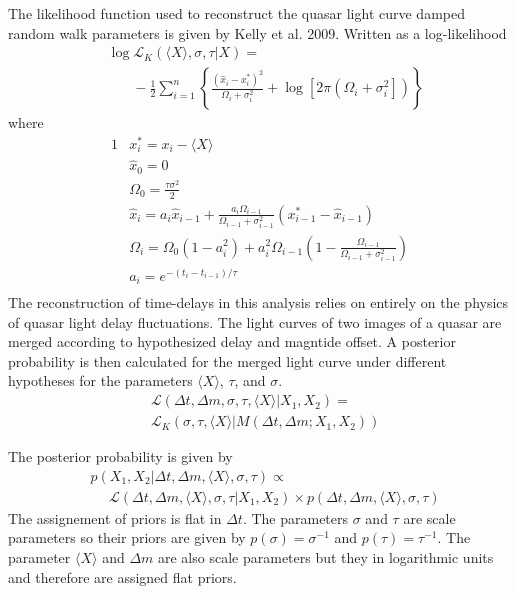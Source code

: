\documentclass{emulateapj}
\begin{document}
The likelihood function used to reconstruct the quasar light curve damped random walk parameters is given by Kelly et al. 2009. Written as a log-likelihood
\begin{align} 
& \log\mathcal{L}_{K}(\langle X\rangle, \sigma,\tau | X) = \nonumber \\
& \ \ \ \ \ \ \ \ -\frac{1}{2}\sum_{i=1}^{n}\left\{
\frac{\left(\hat{x}_i-x^{*}_i\right)^2}{\Omega_i+\sigma_i^2} 
+ 
\log\left[2\pi\left(\Omega_i+\sigma_i^2\right]\right)
\right\}
\end{align}
where 
\begin{alignat}{1}
& x_{i}^{*} = x_i-\langle X \rangle \\
& \hat{x}_0 = 0   \\
& \Omega_{0}=\frac{\tau\sigma^2}{2} \\
& \hat{x}_i = a_i\hat{x}_{i-1} + \frac{a_i\Omega_{i-1}}{\Omega_{i-1}+\sigma^2_{i-1}} \left(x^{*}_{i-1}-\hat{x}_{i-1}\right) \\
& \Omega_{i}=\Omega_{0}\left(1-a_{i}^2\right) + a_{i}^2\Omega_{i-1}\left(1-\frac{\Omega_{i-1}}{\Omega_{i-1}+\sigma_{i-1}^2}\right) \\
& a_i = e^{-\left(t_i-t_{i-1}\right)/\tau} \\
\end{alignat}
The reconstruction of time-delays in this analysis relies on entirely on the physics of quasar light delay fluctuations. The light curves of two images of a quasar are merged according to hypothesized delay and magntide offset. A posterior probability is then calculated for the merged light curve under different hypotheses for the parameters $\langle X\rangle$, $\tau$, and $\sigma$.
\begin{align}
& \mathcal L (\Delta t, \Delta m, \sigma, \tau, \langle X \rangle | X_1, X_2)  = \nonumber \\
& \mathcal{L}_{K} \left( \sigma, \tau, \langle X \rangle  | M(\Delta t,\Delta m ; X_1, X_2) \right)
\end{align}

The posterior probability is given by
\begin{align}
& p(X_1, X_2 | \Delta t, \Delta m, \langle X \rangle, \sigma,\tau) \propto \nonumber \\
&  \ \ \ \ \ \ \mathcal{L}(\Delta t, \Delta m, \langle X \rangle, \sigma,\tau | X_1, X_2)\times p(\Delta t, \Delta m, \langle X \rangle, \sigma,\tau)
\end{align}
The assignement of priors is flat in $\Delta t$. The parameters $\sigma$ and $\tau$ are scale parameters so their priors are given by $p(\sigma)=\sigma^{-1}$ and $p(\tau)=\tau^{-1}$. The parameter $\langle X \rangle$ and $\Delta m$ are also scale parameters but they in logarithmic units and therefore are assigned flat priors.
\end{document}
